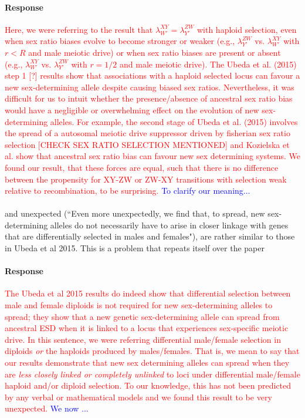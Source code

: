 \documentclass[10pt,letterpaper]{article}
\begin{document}
\noindent\paragraph{Response}
\textcolor{red}{Here, we were referring to the result that $\lambda_{W'}^{XY} = \lambda_{Y'}^{ZW}$ with haploid selection, even when sex ratio biases evolve to become stronger or weaker (e.g., $\lambda_{Y'}^{ZW}$ vs. $\lambda_{W'}^{XY}$ with $r<R$ and male meiotic drive) or when sex ratio biases are present or absent (e.g., $\lambda_{W'}^{XY}$ vs. $\lambda_{Y'}^{ZW}$ with $r=1/2$ and male meiotic drive). The Ubeda et al. (2015) step 1 [?] results show that associations with a haploid selected locus can favour a new sex-determining allele despite causing biased sex ratios. Nevertheless, it was difficult for us to intuit whether the presence/absence of ancestral sex ratio bias would have a negligible or overwhelming effect on the evolution of new sex-determining alleles. For example, the second stage of Ubeda et al. (2015) involves the spread of a autosomal meiotic drive suppressor driven by fisherian sex ratio selection [CHECK SEX RATIO SELECTION MENTIONED] and Kozielska et al. show that ancestral sex ratio bias can favour new sex determining systems. We found our result, that these forces are equal, such that there is no difference between the propensity for XY-ZW or ZW-XY transitions with selection weak relative to recombination, to be surprising.} \textcolor{blue}{To clarify our meaning... }

\paragraph{} \noindent 
\noindent and unexpected (``Even more unexpectedly, we find that, to spread, new sex-determining alleles do not necessarily have to arise in closer linkage with genes that are differentially selected in males and females"), are rather similar to those in Ubeda et al 2015. This is a problem that repeats itself over the paper 

\noindent\paragraph{Response}
\textcolor{red}{The Ubeda et al 2015 results do indeed show that differential selection between male and female diploids is not required for new sex-determining alleles to spread; they show that a new genetic sex-determining allele can spread from ancestral ESD when it is linked to a locus that experiences sex-specific meiotic drive. 
In this sentence, we were referring differential male/female selection in diploids \textit{or} the haploids produced by males/females. 
That is, we mean to say that our results demonstrate that new sex determining alleles can spread when they are \textit{less closely linked or completely unlinked} to loci under differential male/female haploid and/or diploid selection. 
To our knowledge, this has not been predicted by any verbal or mathematical models and we found this result to be very unexpected. }
\textcolor{blue}{We now ...}
\end{document}

